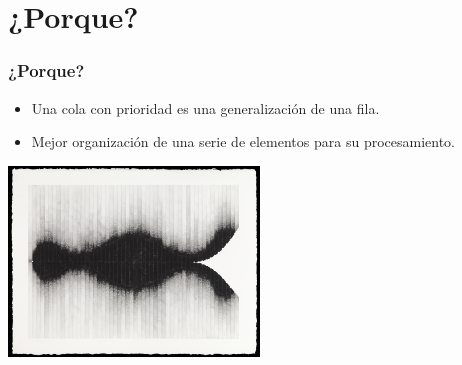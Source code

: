 \documentclass{beamer}
\begin{document}
\section{¿Porque?}

    \begin{frame}
        \frametitle{¿Porque?}
        \begin{itemize}
            \item Una cola con prioridad es una generalización de una fila.
            \item Mejor organización de una serie de elementos para su procesamiento.
        \end{itemize}
        \begin{center}
            \includegraphics[width=0.5\textwidth]{Recursos/kindaQueue.jpg}
        \end{center}
        \pause
    \end{frame}
\end{document}

